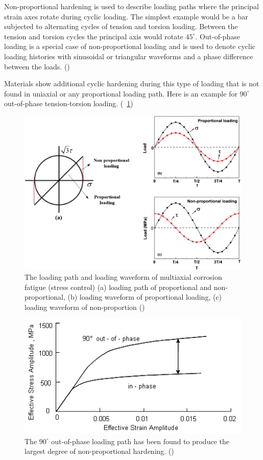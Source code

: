 \documentclass[3p,times,procedia,number]{elsarticle}
\newcommand{\figref}[1]{\figurename~\ref{#1}}
\begin{document}
Non-proportional hardening is used to describe loading paths where the principal strain axes rotate during cyclic loading. The simplest example would be a bar subjected to alternating cycles of tension and torsion loading. Between the tension and torsion cycles the principal axis would rotate $45^\circ$. Out-of-phase loading is a special case of non-proportional loading and is used to denote cyclic loading histories with sinusoidal or triangular waveforms and a phase difference between the loads. (\cite{EFATIGUE})

Materials show additional cyclic hardening during this type of loading that is not found in uniaxial or any proportional loading path. Here is an example for $90^\circ$ out-of-phase tension-torsion loading. (\figref{fig.outofphase})

\begin{figure}[!h]
	\centering
	\includegraphics[width=\textwidth]{figures//outofphase.jpg} 
	\caption{The loading path and loading waveform of multiaxial corrosion fatigue (stress control) (a) loading path of proportional and non-proportional, (b) loading waveform of proportional loading, (c) loading waveform of non-proportion (\cite{HUANG2017259})}
	\label{fig.outofphase}
\end{figure}

\begin{figure}[!h]
	\centering
	\includegraphics[width=\textwidth]{figures//outofphasestress.png} 
	\caption{The $90^\circ$ out-of-phase loading path has been found to produce the largest degree of non-proportional hardening. (\cite{EFATIGUE})}
	\label{fig.outofphasestress}
\end{figure}
\end{document}
